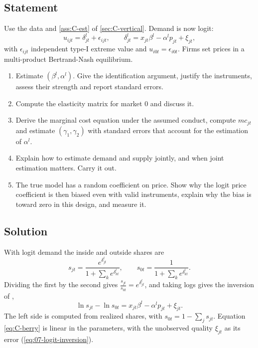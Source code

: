 \subsection{Statement}

Use the data and \cref{ass:C-est} of \cref{sec:C-vertical}. Demand is now logit:
\begin{equation}\label{eq:C-logit}
  u_{ijt} = \delta^l_{jt} + \epsilon_{ijt}, \qquad \delta^l_{jt} = x_{jt}\beta^l - \alpha^l p_{jt} + \xi_{jt},
\end{equation}
with $\epsilon_{ijt}$ independent type-I extreme value and $u_{i0t} = \epsilon_{i0t}$. Firms set prices in a
multi-product Bertrand-Nash equilibrium.

\begin{enumerate}[label=(\alph*)]
  \item Estimate $(\beta^l, \alpha^l)$. Give the identification argument, justify the instruments, assess their strength
  and report standard errors.
  \item Compute the elasticity matrix for market 0 and discuss it.
  \item Derive the marginal cost equation under the assumed conduct, compute $mc_{jt}$ and estimate
  $(\gamma_1, \gamma_2)$ with standard errors that account for the estimation of $\alpha^l$.
  \item Explain how to estimate demand and supply jointly, and when joint estimation matters. Carry it out.
  \item The true model has a random coefficient on price. Show why the logit price coefficient is then biased even with
  valid instruments, explain why the bias is toward zero in this design, and measure it.
\end{enumerate}

\subsection{Solution}

With logit demand the inside and outside shares are
\[
  s_{jt} = \frac{e^{\delta^l_{jt}}}{1 + \sum_{k}e^{\delta^l_{kt}}}, \qquad s_{0t} = \frac{1}{1 + \sum_{k}e^{\delta^l_{kt}}} .
\]
Dividing the first by the second gives $\frac{s_{jt}}{s_{0t}} = e^{\delta^l_{jt}}$, and taking logs gives the inversion of
\citet[eq.~14, p.~250]{Berry1994},
\begin{equation}\label{eq:C-berry}
  \ln s_{jt} - \ln s_{0t} = x_{jt}\beta^l - \alpha^l p_{jt} + \xi_{jt}.
\end{equation}
The left side is computed from realized shares, with $s_{0t} = 1 - \sum_j s_{jt}$. Equation \eqref{eq:C-berry} is
linear in the parameters, with the unobserved quality $\xi_{jt}$ as its error (\cref{eq:07-logit-inversion}).

